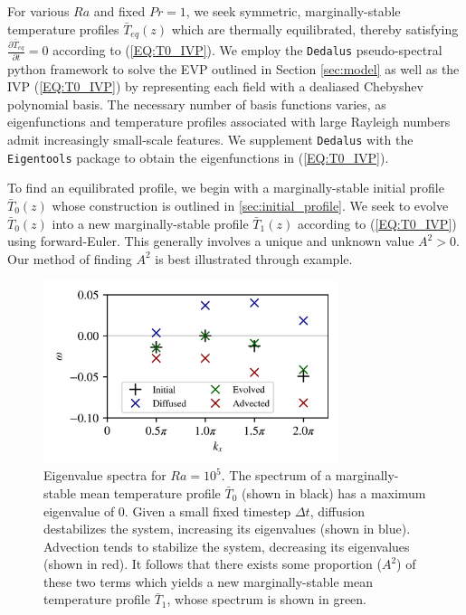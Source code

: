 \documentclass[reprint,amsmath,amssymb,aps]{revtex4-1}
\begin{document}
For various $Ra$ and fixed $Pr = 1$, we seek symmetric, marginally-stable temperature profiles $\bar{T}_{eq}(z)$ which are thermally equilibrated, thereby satisfying $\frac{\partial \bar{T}_{eq}}{\partial t} = 0$ according to (\ref{EQ:T0_IVP}). 
We employ the \texttt{Dedalus} pseudo-spectral python framework to solve the EVP outlined in Section \ref{sec:model} as well as the IVP (\ref{EQ:T0_IVP}) by representing each field with a dealiased Chebyshev polynomial basis. 
The necessary number of basis functions varies, as eigenfunctions and temperature profiles associated with large Rayleigh numbers admit increasingly small-scale features. 
We supplement \texttt{Dedalus} with the \texttt{Eigentools} package to obtain the eigenfunctions in (\ref{EQ:T0_IVP}).

To find an equilibrated profile, we begin with a marginally-stable initial profile $\bar{T}_0(z)$ whose construction is outlined in \ref{sec:initial_profile}. 
We seek to evolve $\bar{T}_0(z)$ into a new marginally-stable profile $\bar{T}_1(z)$ according to (\ref{EQ:T0_IVP}) using forward-Euler. 
This generally involves a unique and unknown value $A^2 > 0$. 
Our method of finding $A^2$ is best illustrated through example.

\begin{figure}
    \includegraphics[width=3.4in]{EV_spectrum_ol.png}
    \caption{Eigenvalue spectra for $Ra = 10^5$. The spectrum of a marginally-stable mean temperature profile $\bar{T}_0$ (shown in black) has a maximum eigenvalue of 0. 
    Given a small fixed timestep $\Delta t$, diffusion destabilizes the system, increasing its eigenvalues (shown in blue). 
    Advection tends to stabilize the system, decreasing its eigenvalues (shown in red). 
    It follows that there exists some proportion ($A^2$) of these two terms which yields a new marginally-stable mean temperature profile $\bar{T}_1$, whose spectrum is shown in green.}
    \label{fig:iteration_spectra} 
\end{figure}
\end{document}
